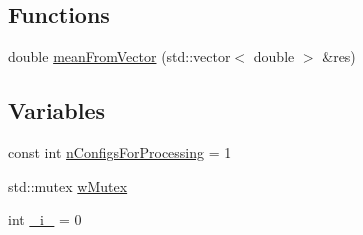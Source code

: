 \subsection*{\-Functions}
\begin{DoxyCompactItemize}
\item 
double \hyperlink{namespace_p_r_p_s_evolution_1_1_solve_a8ad4a49ba2ce81d1cf0aa09d0061b0ac}{mean\-From\-Vector} (std\-::vector$<$ double $>$ \&res)
\end{DoxyCompactItemize}
\subsection*{\-Variables}
\begin{DoxyCompactItemize}
\item 
const int \hyperlink{namespace_p_r_p_s_evolution_1_1_solve_a0a0db6d4ef7ce0baa2b7e184b20873f8}{n\-Configs\-For\-Processing} = 1
\item 
std\-::mutex \hyperlink{namespace_p_r_p_s_evolution_1_1_solve_acfd9153e49dded44fda3314a7712fb4a}{w\-Mutex}
\item 
int \hyperlink{namespace_p_r_p_s_evolution_1_1_solve_ad8dbcbee23628608abd3af64b87e06d1}{\-\_\-i\-\_\-} = 0
\end{DoxyCompactItemize}



